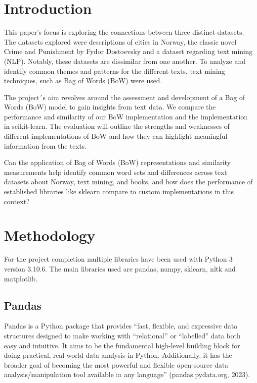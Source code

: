 \documentclass{article}
\begin{document}
\begin{multicols}{2}

\section{Introduction}

This paper's focus is exploring the connections between three distinct datasets. The datasets explored were descriptions of cities in Norway, the classic novel Crime and Punishment by Fydor Dostoevsky and a dataset regarding text mining (NLP). Notably, these datasets are dissimilar from one another. To analyze and identify common themes and patterns for the different texts, text mining techniques, such as Bag of Words (BoW) were used.

The project´s aim revolves around the assessment and development of a Bag of Words (BoW) model to gain insights from text data. We compare the performance and similarity of our BoW implementation and the implementation in scikit-learn. The evaluation will outline the strengths and weaknesses of different implementations of BoW and how they can highlight meaningful information from the texts. 

Can the application of Bag of Words (BoW) representations and similarity measurements help identify common word sets and differences across text datasets about Norway, text mining, and books, and how does the performance of established libraries like sklearn compare to custom implementations in this context?


\section{Methodology}

For the project completion multiple libraries have been used with Python 3 version 3.10.6. The main libraries used are pandas, numpy, sklearn, nltk and matplotlib.

\subsection{Pandas}

Pandas is a Python package that provides “fast, flexible, and expressive data structures designed to make working with “relational” or “labelled” data both easy and intuitive. It aims to be the fundamental high-level building block for doing practical, real-world data analysis in Python. Additionally, it has the broader goal of becoming the most powerful and flexible open-source data analysis/manipulation tool available in any language” (pandas.pydata.org, 2023).


\end{multicols}
\end{document}
